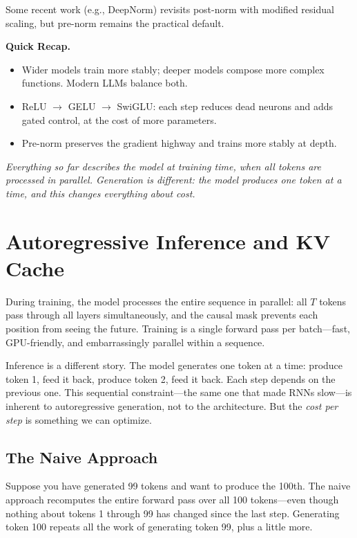 Some recent work (e.g., DeepNorm) revisits post-norm with modified residual scaling, but pre-norm remains the practical default.

\begin{quickrecap}
\textbf{Quick Recap.}
\begin{itemize}[nosep,leftmargin=1.5em]
  \item Wider models train more stably; deeper models compose more complex functions. Modern LLMs balance both.
  \item ReLU $\to$ GELU $\to$ SwiGLU: each step reduces dead neurons and adds gated control, at the cost of more parameters.
  \item Pre-norm preserves the gradient highway and trains more stably at depth.
\end{itemize}
\textit{Everything so far describes the model at training time, when all tokens are processed in parallel. Generation is different: the model produces one token at a time, and this changes everything about cost.}
\end{quickrecap}


\section{Autoregressive Inference and KV Cache}
\label{sec:kv-cache}

During training, the model processes the entire sequence in parallel: all $T$ tokens pass through all layers simultaneously, and the causal mask prevents each position from seeing the future. Training is a single forward pass per batch---fast, GPU-friendly, and embarrassingly parallel within a sequence.

Inference is a different story. The model generates one token at a time: produce token 1, feed it back, produce token 2, feed it back. Each step depends on the previous one. This sequential constraint---the same one that made RNNs slow---is inherent to autoregressive generation, not to the architecture. But the \emph{cost per step} is something we can optimize.

\subsection{The Naive Approach}

Suppose you have generated 99 tokens and want to produce the 100th. The naive approach recomputes the entire forward pass over all 100 tokens---even though nothing about tokens 1 through 99 has changed since the last step. Generating token 100 repeats all the work of generating token 99, plus a little more.

